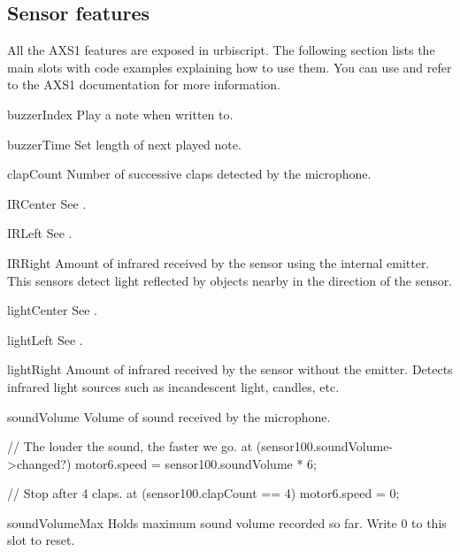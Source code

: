 \subsection{Sensor features}

All the AXS1 features are exposed in urbiscript. The following section lists
the main slots with code examples explaining how to use them.  You can use
 and refer to the AXS1 documentation for
more information.

\begin{urbiscriptapi}
\item[buzzerIndex]
  Play a note when written to.


\item[buzzerTime]
  Set length of next played note.


\item[clapCount]
  Number of successive claps detected by the microphone.


\item[IRCenter] See .


\item[IRLeft] See .


\item[IRRight] Amount of infrared received by the sensor using the internal
  emitter. This sensors detect light reflected by objects nearby in the
  direction of the sensor.


\item[lightCenter] See .


\item[lightLeft] See .


\item[lightRight] Amount of infrared received by the sensor without the
  emitter. Detects infrared light sources such as incandescent light,
  candles, etc.


\item[soundVolume]
  Volume of sound received by the microphone.

\begin{urbiunchecked}
// The louder the sound, the faster we go.
at (sensor100.soundVolume->changed?)
  motor6.speed = sensor100.soundVolume * 6;

// Stop after 4 claps.
at (sensor100.clapCount == 4)
  motor6.speed = 0;
\end{urbiunchecked}


\item[soundVolumeMax] Holds maximum sound volume recorded so far. Write 0 to
  this slot to reset.
\end{urbiscriptapi}


